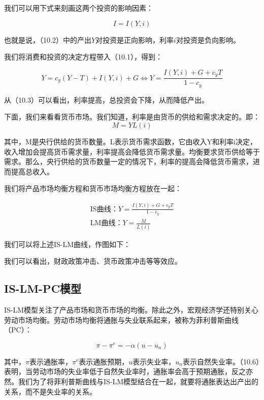 \documentclass[cn,12pt,math=newtx,citestyle=gb7714-2015,bibstyle=gb7714-2015]{elegantbook}
\begin{document}
	我们可以用下式来刻画这两个投资的影响因素：
	
	\begin{equation}
		I = I(Y,i)
	\end{equation}
	
	也就是说，（10.2）中的产出$Y$对投资是正向影响，利率$i$对投资是负向影响。
	
	我们将消费和投资的决定方程带入（10.1），得到：
	
	\begin{equation}
		Y = c_y(Y-T) + I(Y,i) + G  \Leftrightarrow  Y = \frac{I(Y,i)+G+c_y T}{1-c_y}
	\end{equation}

从（10.3）可以看出，利率提高，总投资会下降，从而降低产出。

下面，我们来看看货币市场。我们知道，利率是由货币的供给和需求决定的。即：
\begin{equation}
	M =Y L(i)
\end{equation}
	
	其中，M是央行供给的货币数量。L表示货币需求函数，它由收入Y和利率i决定，收入增加会提高货币需求量，利率提高会降低货币需求量。均衡要求货币供给等于需求。那么，央行供给的货币数量一定的情况下，利率的提高会降低货币需求，进而提高总收入。
	
	我们将产品市场均衡方程和货币市场均衡方程放在一起：
	
	\begin{equation}
		\begin{array}{l}
			\text{IS曲线：}   Y = \frac{I(Y,i)+G+c_y T}{1-c_y}\\
			\text{LM曲线：}     Y=\frac{M}{L(i)}
		\end{array}
	\end{equation}
	
	我们可以将上述IS-LM曲线，作图如下：
	
	
	我们可以看出，财政政策冲击、货币政策冲击等等效应。
	
	\subsection{IS-LM-PC模型}
	
	IS-LM模型关注了产品市场和货币市场的均衡。除此之外，宏观经济学还特别关心劳动市场均衡。劳动市场均衡将通胀与失业联系起来，被称为菲利普斯曲线（PC）：
	
	\begin{equation}
		\pi -\pi^e = -\alpha(u-u_n)
	\end{equation}

其中，$\pi$表示通胀率，$\pi^e$表示通胀预期，$u$表示失业率，$u_n$表示自然失业率。（10.6）表明，当劳动市场的失业率低于自然失业率时，通胀率会高于预期通胀，反之亦然。我们为了将菲利普斯曲线与IS-LM模型结合在一起，就要将通胀表达出产出的关系，而不是失业率的关系。
\end{document}
